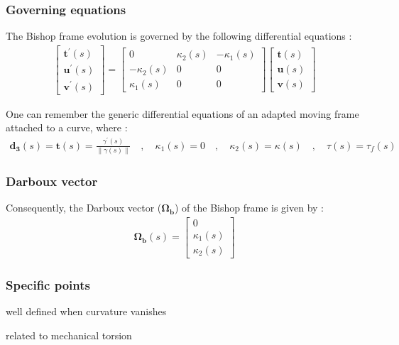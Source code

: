 \subsubsection{Governing equations}
The Bishop frame evolution is governed by the following differential equations :
\begin{gather}
\left[\begin{array}{c}
\mathbf{t^{'}}(s) \\
\mathbf{u^{'}}(s) \\
\mathbf{v^{'}}(s)
\end{array}\right]
=
\left[\begin{array}{ccc}
0 & \kappa_{2}(s) & -\kappa_{1}(s) \\
-\kappa_{2}(s) & 0 & 0 \\
\kappa_{1}(s) & 0 & 0
\end{array}\right]
\left[\begin{array}{c}
\mathbf{t}(s) \\
\mathbf{u}(s) \\
\mathbf{v}(s)
\end{array}\right]
\end{gather}

One can remember the generic differential equations of an adapted moving frame attached to a curve, where : 
\begin{gather}
\mathbf{d_{3}}(s) = \mathbf{t}(s) = \frac{\gamma^{'}(s)}{\|\gamma(s)\|}
\quad,\quad
\kappa_{1}(s) = 0
\quad,\quad
\kappa_{2}(s) = \kappa(s)
\quad,\quad
\tau(s) = \tau_{f}(s)
\end{gather}

\subsubsection{Darboux vector}
Consequently, the Darboux vector ($\mathbf{\Omega_{b}}$) of the Bishop frame is given by :
\begin{gather}
\mathbf{\Omega_b}(s) 
= 
\left[\begin{array}{c}
0\\
\kappa_1(s)\\
\kappa_2(s)
\end{array}\right]
\end{gather}

\subsubsection{Specific points}
well defined when curvature vanishes

related to mechanical torsion




